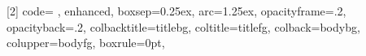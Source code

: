 

\makeatletter
\newenvironment{labeling}[2][]{%
	\def\sc@septext{#1}%
	\list{}{\settowidth{\labelwidth}{{%
					#2%
					\sc@septext%
				}}%
		\leftmargin\labelwidth \advance\leftmargin by \labelsep
		\let\makelabel\labelinglabel
	}%
}{%
	\endlist
}
\newcommand\labelinglabel[1]{%
	#1\hfil
	\sc@septext%
}
\makeatother

\newenvironment{blockcolor}
{\begin{alertblock}
		}
		{

		\centering
		\texttt{[image: figures/batik.png]}
	\end{alertblock}
}

\newcommand{\notec}[1]{\note{\vfill
		{#1}
		\vfill
	}}

\usepackage[most]{tcolorbox}
[2]{%
	code={%
		},
	enhanced,
	boxsep=0.25ex,
	arc=1.25ex,
	opacityframe=.2,
	opacityback=.2,
	colbacktitle=titlebg,
	coltitle=titlefg,
	colback=bodybg,
	colupper=bodyfg,
	boxrule=0pt,
}


